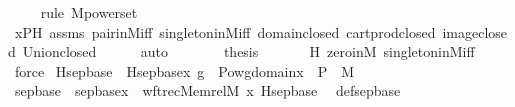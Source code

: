 \begin{isabellebody}
\ \ \ \ \isamarkupfalse%
{\isacharparenleft}{\kern0pt}rule\ M{\isacharunderscore}{\kern0pt}powerset{\isacharparenright}{\kern0pt}\isanewline
\ \ \ \ \isamarkupfalse%
\ xPH\ assms\ pair{\isacharunderscore}{\kern0pt}in{\isacharunderscore}{\kern0pt}M{\isacharunderscore}{\kern0pt}iff\ singleton{\isacharunderscore}{\kern0pt}in{\isacharunderscore}{\kern0pt}M{\isacharunderscore}{\kern0pt}iff\ domain{\isacharunderscore}{\kern0pt}closed\ cartprod{\isacharunderscore}{\kern0pt}closed\ image{\isacharunderscore}{\kern0pt}closed\ Union{\isacharunderscore}{\kern0pt}closed\isanewline
\ \ \ \ \isamarkupfalse%
\ auto\ \ \isanewline
\isanewline
\ \ \isamarkupfalse%
\ \isamarkupfalse%
\ {\isacharquery}{\kern0pt}thesis\ \isanewline
\ \ \ \ \isamarkupfalse%
\ H\ zero{\isacharunderscore}{\kern0pt}in{\isacharunderscore}{\kern0pt}M\ singleton{\isacharunderscore}{\kern0pt}in{\isacharunderscore}{\kern0pt}M{\isacharunderscore}{\kern0pt}iff\ \isamarkupfalse%
\ force\isanewline
{}\isamarkupfalse%
%
\endisatagproof
{\isafoldproof}%
%
\isadelimproof
\isanewline
%
\endisadelimproof
\isanewline
{}\isamarkupfalse%
\ Hsep{\isacharunderscore}{\kern0pt}base\ \ {\isachardoublequoteopen}Hsep{\isacharunderscore}{\kern0pt}base{\isacharparenleft}{\kern0pt}x{\isacharcomma}{\kern0pt}\ g{\isacharparenright}{\kern0pt}\ {\isasymequiv}\ Pow{\isacharparenleft}{\kern0pt}{\isacharparenleft}{\kern0pt}{\isasymUnion}{\isacharparenleft}{\kern0pt}g{\isacharbackquote}{\kern0pt}{\isacharbackquote}{\kern0pt}domain{\isacharparenleft}{\kern0pt}x{\isacharparenright}{\kern0pt}{\isacharparenright}{\kern0pt}{\isacharparenright}{\kern0pt}\ {\isasymtimes}\ P{\isacharparenright}{\kern0pt}\ {\isasyminter}\ M{\isachardoublequoteclose}\isanewline
\isanewline
{}\isamarkupfalse%
\ sep{\isacharunderscore}{\kern0pt}base\ \ {\isachardoublequoteopen}sep{\isacharunderscore}{\kern0pt}base{\isacharparenleft}{\kern0pt}x{\isacharparenright}{\kern0pt}\ {\isasymequiv}\ wftrec{\isacharparenleft}{\kern0pt}Memrel{\isacharparenleft}{\kern0pt}M{\isacharparenright}{\kern0pt}{\isacharcircum}{\kern0pt}{\isacharplus}{\kern0pt}{\isacharcomma}{\kern0pt}\ x{\isacharcomma}{\kern0pt}\ Hsep{\isacharunderscore}{\kern0pt}base{\isacharparenright}{\kern0pt}{\isachardoublequoteclose}\ \isanewline
\isanewline
{}\isamarkupfalse%
\ def{\isacharunderscore}{\kern0pt}sep{\isacharunderscore}{\kern0pt}base\ {\isacharcolon}{\kern0pt}\ \isanewline

\end{isabellebody}
